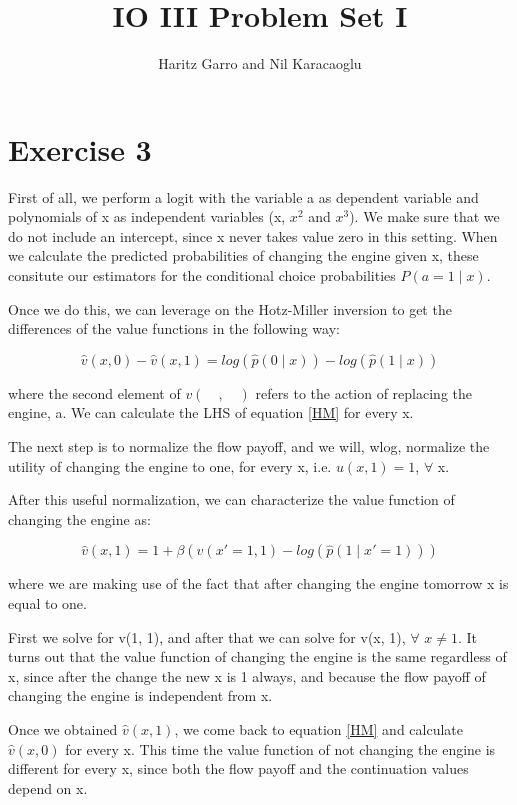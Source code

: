 \documentclass[12 pt]{article}
\title{IO III Problem Set I}
\author{Haritz Garro and Nil Karacaoglu}
\begin{document}
\maketitle

\section{Exercise 3}

First of all, we perform a logit with the variable a as dependent variable and polynomials of x as independent variables (x, $x^2$ and $x^3$). We make sure that we do not include an intercept, since x never takes value zero in this setting. When we calculate the predicted probabilities of changing the engine given x, these consitute our estimators for the conditional choice probabilities $P(a = 1 \mid x)$.

Once we do this, we can leverage on the Hotz-Miller inversion to get the differences of the value functions in the following way:

\begin{equation}\label{HM}
\hat{v}(x, 0) - \hat{v}(x, 1) = log(\hat{p}(0 \mid x)) - log(\hat{p}(1 \mid x)) 
\end{equation}

where the second element of $v(\quad,\quad)$ refers to the action of replacing the engine, a. We can calculate the LHS of equation \ref{HM} for every x.

The next step is to normalize the flow payoff, and we will, wlog, normalize the utility of changing the engine to one, for every x, i.e. $u(x, 1) = 1$, $\forall$ x.

After this useful normalization, we can characterize the value function of changing the engine as:

\begin{equation}
\hat{v}(x, 1) = 1 + \beta \left(v(x'=1, 1) - log(\hat{p}(1 \mid x'=1)) \right) 
\end{equation}

where we are making use of the fact that after changing the engine tomorrow x is equal to one.

First we solve for v(1, 1), and after that we can solve for v(x, 1), $\forall$ $x \neq 1$. It turns out that the value function of changing the engine is the same regardless of x, since after the change the new x is 1 always, and because the flow payoff of changing the engine is independent from x.

Once we obtained $\hat{v}(x, 1)$, we come back to equation \ref{HM} and calculate $\hat{v}(x, 0)$ for every x. This time the value function of not changing the engine is different for every x, since both the flow payoff and the continuation values depend on x.
\end{document}
